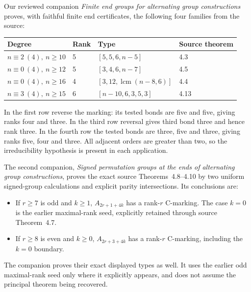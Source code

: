 \documentclass[11pt]{article}
\begin{document}
Our reviewed companion \emph{Finite end groups for alternating
group constructions} proves, with faithful finite end certificates,
the following four families from the source:
\begin{center}\small
\begin{tabular}{llll}
\toprule
Degree & Rank & Type & Source theorem\\\midrule
$n\equiv2\ (4),\ n\ge10$ &5&$[5,5,6,n-5]$&4.3\\
$n\equiv0\ (4),\ n\ge12$ &5&$[3,4,6,n-7]$&4.5\\
$n\equiv0\ (4),\ n\ge16$ &4&$[3,12,\operatorname{lcm}(n-8,6)]$&4.4\\
$n\equiv3\ (4),\ n\ge15$ &6&$[n-10,6,3,5,3]$&4.13\\\bottomrule
\end{tabular}
\end{center}
In the first row reverse the marking: its tested bonds are five
and five, giving ranks four and three. In the third row reversal
gives third bond three and hence rank three. In the fourth row
the tested bonds are three, five and three, giving ranks five,
four and three. All adjacent orders are greater than two, so the
irreducibility hypothesis is present in each application.

The second companion, \emph{Signed permutation groups at the ends
of alternating group constructions}, proves the exact source
Theorems~4.8--4.10 by two uniform signed-group calculations and
explicit parity intersections. Its conclusions are:
\begin{itemize}
\item If $r\ge7$ is odd and $k\ge1$, $A_{2r+1+4k}$ has a
rank-$r$ C-marking. The case $k=0$ is the earlier maximal-rank
seed, explicitly retained through source Theorem~4.7.
\item If $r\ge8$ is even and $k\ge0$, $A_{2r+3+4k}$ has a
rank-$r$ C-marking, including the $k=0$ boundary.
\end{itemize}
The companion proves their exact displayed types as well.
It uses the earlier odd maximal-rank seed only where it explicitly
appears, and does not assume the principal theorem being recovered.
\end{document}
